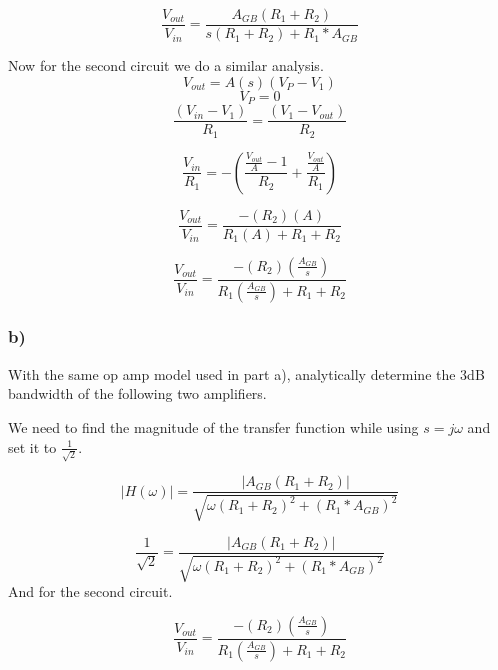 \documentclass[10pt,a4paper]{article}
\begin{document}
\begin{equation}
\frac{V_{out}}{V_{in}} = \frac{A_{GB}(R_1 + R_2)}{s(R_1 + R_2) + R_1 * A_{GB}} 
\end{equation}


Now for the second circuit we do a similar analysis.
\begin{equation}
V_{out} = A(s)(V_P - V_1)
\end{equation}
\begin{equation}
V_P = 0
\end{equation}
\begin{equation}
\frac{(V_{in} - V_{1})}{R_1} = \frac{(V_{1} - V_{out})}{R_2}
\end{equation}

\begin{equation}
\frac{V_{in}}{R_1} = -(\frac{\frac{V_{out}}{A} - 1}{R_2} + \frac{\frac{V_{out}}{A}}{R_1})
\end{equation}

\begin{equation}
\frac{V_{out}}{V_{in}} = \frac{-(R_2)(A)}{R_1(A) + R_1 + R_2}
\end{equation}


\begin{equation}
\frac{V_{out}}{V_{in}} = \frac{-(R_2)(\frac{A_{GB}}{s})}{R_1(\frac{A_{GB}}{s}) + R_1 + R_2}
\end{equation}


\subsubsection*{b)}
With the same op amp model used in part a), analytically determine the 3dB
bandwidth of the following two amplifiers.

We need to find the magnitude of the transfer function while using $s=j\omega$ and set it to $\frac{1}{\sqrt{2}}$.

\begin{equation}
|H(\omega)| = \frac{|A_{GB}(R_1 + R_2)|}{\sqrt{\omega(R_1 + R_2)^2 + (R_1 * A_{GB})^2}}
\end{equation}

\begin{equation}
\frac{1}{\sqrt{2}} = \frac{|A_{GB}(R_1 + R_2)|}{\sqrt{\omega(R_1 + R_2)^2 + (R_1 * A_{GB})^2}}
\end{equation}
And for the second circuit.

\begin{equation}
\frac{V_{out}}{V_{in}} = \frac{-(R_2)(\frac{A_{GB}}{s})}{R_1(\frac{A_{GB}}{s}) + R_1 + R_2}
\end{equation}
\end{document}
